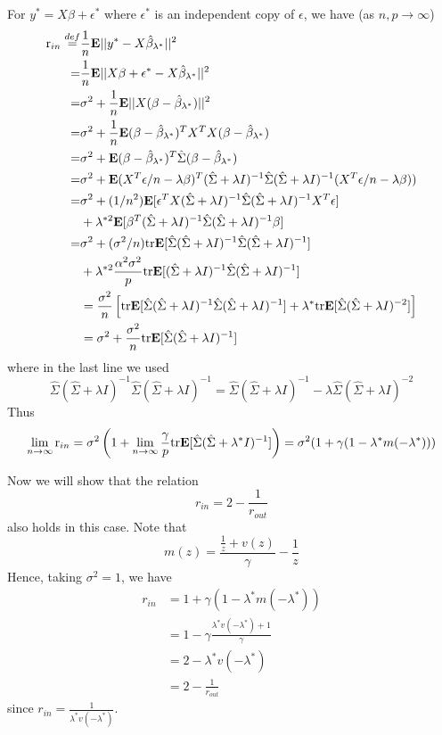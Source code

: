 \documentclass[11pt]{article}
\begin{document}
For $y^* = X \beta + \epsilon^*$ where
$\epsilon^*$ is an independent copy of $\epsilon$, we have (as $n, p
\to \infty$)
\begin{align*}
\text{r}_{in} \stackrel{def}{=}& \frac{1}{n}\textbf{E}||y^* - X\hat{\beta}_{\lambda^*}||^2
\\=& \frac{1}{n}\textbf{E}||X\beta + \epsilon^* - X\hat{\beta}_{\lambda^*}||^2
\\=& \sigma^2 + \frac{1}{n}\textbf{E}||X(\beta - \hat{\beta}_{\lambda^*})||^2
\\=& \sigma^2 + \frac{1}{n} \textbf{E} (\beta - \hat{\beta}_{\lambda^*})^T X^T X (\beta - \hat{\beta}_{\lambda^*})
\\=& \sigma^2 + \textbf{E} (\beta - \hat{\beta}_{\lambda^*})^T \hat{\Sigma} (\beta - \hat{\beta}_{\lambda^*})
\\=& \sigma^2 + \textbf{E} (X^T\epsilon/n - \lambda \beta)^T (\hat{\Sigma} + \lambda I)^{-1} \hat{\Sigma} (\hat{\Sigma} + \lambda I)^{-1} (X^T\epsilon/n - \lambda \beta))
\\=& \sigma^2 + (1/n^2)\textbf{E} [\epsilon^T X (\hat{\Sigma} + \lambda I)^{-1} \hat{\Sigma} (\hat{\Sigma} + \lambda I)^{-1} X^T \epsilon]
\\&+ \lambda^{*2} \textbf{E}[ \beta^T (\hat{\Sigma} + \lambda I)^{-1} \hat{\Sigma} (\hat{\Sigma} + \lambda I)^{-1} \beta]
\\=& \sigma^2 + (\sigma^2/n)\text{tr} \textbf{E} [\hat{\Sigma}(\hat{\Sigma} + \lambda I)^{-1} \hat{\Sigma} (\hat{\Sigma} + \lambda I)^{-1}]
\\&+ \lambda^{*2} \frac{\alpha^2\sigma^2}{p}\text{tr}\textbf{E}[(\hat{\Sigma} + \lambda I)^{-1} \hat{\Sigma} (\hat{\Sigma} + \lambda I)^{-1}]
\\&= \frac{\sigma^2}{n}\left[\text{tr}\textbf{E} [\hat{\Sigma}(\hat{\Sigma} + \lambda I)^{-1} \hat{\Sigma} (\hat{\Sigma} + \lambda I)^{-1}]
 + \lambda^* \text{tr}\textbf{E}[\hat{\Sigma}(\hat{\Sigma} + \lambda I)^{-2}  ]\right]
\\&= \sigma^2 + \frac{\sigma^2}{n} \text{tr}\textbf{E} [\hat{\Sigma}(\hat{\Sigma} + \lambda I)^{-1}]
\end{align*}
where in the last line we used
\[
\hat{\Sigma}(\hat{\Sigma} + \lambda I)^{-1} \hat{\Sigma} (\hat{\Sigma} + \lambda I)^{-1} = \hat{\Sigma}(\hat{\Sigma} + \lambda I)^{-1}  - \lambda \hat{\Sigma}(\hat{\Sigma} + \lambda I)^{-2}
\]
Thus
\[
\lim_{n \to \infty} \text{r}_{in} = \sigma^2 \left(1 + \lim_{n \to \infty} \frac{\gamma}{p} \text{tr}\textbf{E} [\hat{\Sigma}(\hat{\Sigma} + \lambda^* I)^{-1}]\right) = \sigma^2 (1 + \gamma (1- \lambda^* m(-\lambda^*)))
\]

Now we will show that the relation
\[
r_{in} = 2 - \frac{1}{r_{out}}
\]
also holds in this case.
Note that
\[
m(z) = \frac{\frac{1}{z} + v(z)}{\gamma} - \frac{1}{z}
\]
Hence, taking $\sigma^2 = 1$, we have
\begin{align*}
r_{in} &= 1 + \gamma ( 1 - \lambda^* m(-\lambda^*))
\\&= 1 - \gamma \frac{\lambda^* v(-\lambda^*) + 1}{\gamma}
\\&= 2 - \lambda^* v(-\lambda^*)
\\&= 2 - \frac{1}{r_{out}}
\end{align*}
since $r_{in} = \frac{1}{\lambda^* v(-\lambda^*)}$.
\end{document}
